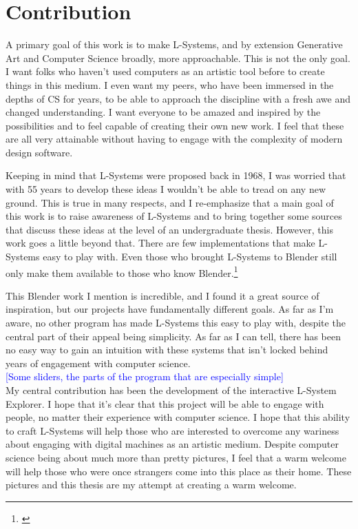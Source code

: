 \documentclass[12pt,twoside]{reedthesis}
\begin{document}
\chapter{Contribution}
	A primary goal of this work is to make L-Systems, and by extension Generative Art and Computer Science broadly, more approachable. This is not the only goal. I want folks who haven't used computers as an artistic tool before to create things in this medium. I even want my peers, who have been immersed in the depths of CS for years, to be able to approach the discipline with a fresh awe and changed understanding. I want everyone to be amazed and inspired by the possibilities and to feel capable of creating their own new work.  I feel that these are all very attainable without having to engage with the complexity of modern design software.
	
	Keeping in mind that L-Systems were proposed back in 1968, I was worried that with 55 years to develop these ideas I wouldn't be able to tread on any new ground. This is true in many respects, and I re-emphasize that a main goal of this work is to raise awareness of L-Systems and to bring together some sources that discuss these ideas at the level of an undergraduate thesis. However, this work goes a little beyond that. There are few implementations that make L-Systems easy to play with. Even those who brought L-Systems to Blender still only make them available to those who know Blender.\footnote{\cite{Leopold2017}}
	
	This Blender work I mention is incredible, and I found it a great source of inspiration, but our projects have fundamentally different goals. As far as I'm aware, no other program has made L-Systems this easy to play with, despite the central part of their appeal being simplicity. As far as I can tell, there has been no easy way to gain an intuition with these systems that isn't locked behind years of engagement with computer science.\\
	
	\textcolor{blue}{[Some sliders, the parts of the program that are especially simple]}\\
	
	My central contribution has been the development of the interactive L-System Explorer. I hope that it's clear that this project will be able to engage with people, no matter their experience with computer science. I hope that this ability to craft L-Systems will help those who are interested to overcome any wariness about engaging with digital machines as an artistic medium. Despite computer science being about much more than pretty pictures, I feel that a warm welcome will help those who were once strangers come into this place as their home. These pictures and this thesis are my attempt at creating a warm welcome.
\end{document}
